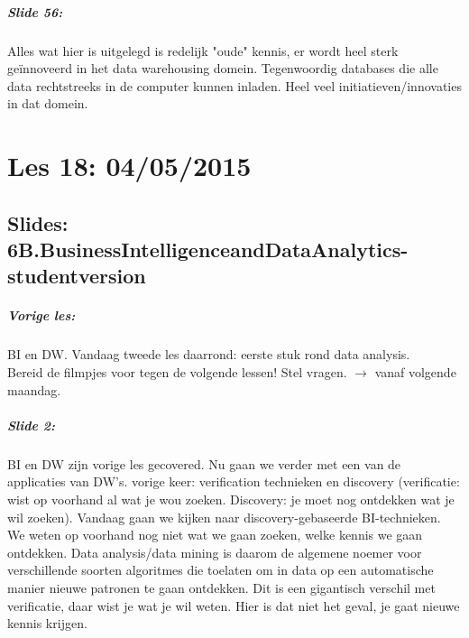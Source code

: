 \documentclass[10pt,a4paper]{report}
\begin{document}
\paragraph{Slide 56:}Alles wat hier is uitgelegd is redelijk "oude" kennis, er wordt heel sterk geïnnoveerd in het data warehousing domein.
Tegenwoordig databases die alle data rechtstreeks in de computer kunnen inladen. Heel veel initiatieven/innovaties in dat domein.

\chapter{Les 18: 04/05/2015}
\section{Slides: 6B.BusinessIntelligenceandDataAnalytics-studentversion}

\paragraph{Vorige les:}BI en DW. Vandaag tweede les daarrond: eerste stuk rond data analysis. \\
Bereid de filmpjes voor tegen de volgende lessen! Stel vragen. $\rightarrow$ vanaf volgende maandag.

\paragraph{Slide 2:}BI en DW zijn vorige les gecovered. Nu gaan we verder met een van de applicaties van DW's. vorige keer: verification technieken en discovery (verificatie: wist op voorhand al wat je wou zoeken. Discovery: je moet nog ontdekken wat je wil zoeken). Vandaag gaan we kijken naar discovery-gebaseerde BI-technieken. We weten op voorhand nog niet wat we gaan zoeken, welke kennis we gaan ontdekken. Data analysis/data mining is daarom de algemene noemer voor verschillende soorten algoritmes die toelaten om in data op een automatische manier nieuwe patronen te gaan ontdekken. Dit is een gigantisch verschil met verificatie, daar wist je wat je wil weten. Hier is dat niet het geval, je gaat nieuwe kennis krijgen.
\end{document}
